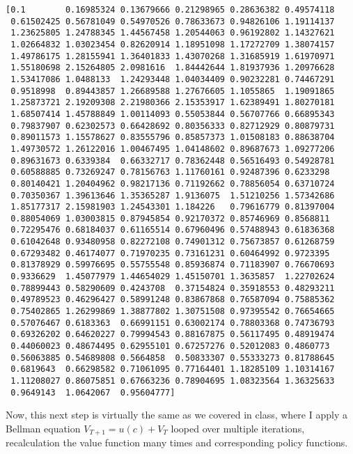 \documentclass[11pt]{article}
\begin{document}
    \begin{Verbatim}[commandchars=\\\{\}]
[0.1        0.16985324 0.13679666 0.21298965 0.28636382 0.49574118
 0.61502425 0.56781049 0.54970526 0.78633673 0.94826106 1.19114137
 1.23625805 1.24788345 1.44567458 1.20544063 0.96192802 1.14327621
 1.02664832 1.03023454 0.82620914 1.18951098 1.17272709 1.38074157
 1.49786175 1.28155941 1.36401833 1.43070268 1.31685919 1.61970971
 1.55180698 2.15264805 2.0981616  1.84442644 1.81937936 1.20976628
 1.53417086 1.0488133  1.24293448 1.04034409 0.90232281 0.74467291
 0.9518998  0.89443857 1.26689588 1.27676605 1.1055865  1.19091865
 1.25873721 2.19209308 2.21980366 2.15353917 1.62389491 1.80270181
 1.68507414 1.45788849 1.00114093 0.55053844 0.56707766 0.66895343
 0.79837907 0.62302573 0.66428692 0.80356333 0.82712929 0.80879731
 0.89011573 1.15578627 0.83555796 0.85857373 1.01508183 0.88638704
 1.49730572 1.26122016 1.00467495 1.04148602 0.89687673 1.09277206
 0.89631673 0.6339384  0.66332717 0.78362448 0.56516493 0.54928781
 0.60588885 0.73269247 0.78156763 1.11760161 0.92487396 0.6233298
 0.80140421 1.20404962 0.98217136 0.71192662 0.78856054 0.63710724
 0.70350367 1.39613646 1.35365287 1.9136075  1.51210256 1.57342686
 1.85177317 2.15981903 1.24543301 1.184226   0.79616779 0.81397004
 0.88054069 1.03003815 0.87945854 0.92170372 0.85746969 0.8568811
 0.72295476 0.68184037 0.61165514 0.67960496 0.57488943 0.61836368
 0.61042648 0.93480958 0.82272108 0.74901312 0.75673857 0.61268759
 0.67293482 0.46174077 0.71970235 0.73161231 0.60464992 0.9723395
 0.81378929 0.59976695 0.55755548 0.85936874 0.71183907 0.76670693
 0.9336629  1.45077979 1.44654029 1.45150701 1.3635857  1.22702624
 0.78899443 0.58290609 0.4243708  0.37154824 0.35918553 0.48293211
 0.49789523 0.46296427 0.58991248 0.83867868 0.76587094 0.75885362
 0.75402865 1.26299869 1.38877802 1.30751508 0.97395542 0.76654665
 0.57076467 0.6183363  0.66991151 0.63002174 0.78803368 0.74736793
 0.69326202 0.64620227 0.79994543 0.88167875 0.56117495 0.48919474
 0.44060023 0.48674495 0.62955101 0.67257276 0.52012083 0.4860773
 0.56063885 0.54689808 0.5664858  0.50833307 0.55333273 0.81788645
 0.6819643  0.66298582 0.71061095 0.77164401 1.18285109 1.10314167
 1.11208027 0.86075851 0.67663236 0.78904695 1.08323564 1.36325633
 0.9649143  1.0642067  0.95604777]

    \end{Verbatim}

    Now, this next step is virtually the same as we covered in class, where
I apply a Bellman equation \(V_{T+1} = u(c) + V_{T}\) looped over
multiple iterations, recalculation the value function many times and
corresponding policy functions.
\end{document}
